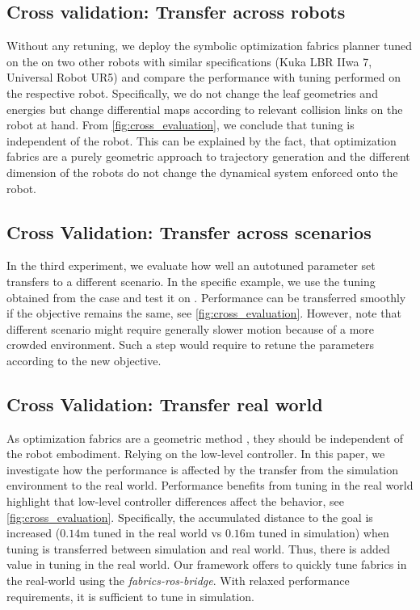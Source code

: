 \subsection{Cross validation: Transfer across robots}
\label{sub:cross_validation_robots}
%
Without any retuning, we deploy the symbolic optimization fabrics planner tuned
on the \panda{} on two other robots with similar specifications (Kuka LBR IIwa
7, Universal Robot UR5) and compare the performance with tuning performed on
the respective robot. 
Specifically, we do not change the leaf geometries and energies but change
differential maps according to relevant collision links on the robot at hand.
From \cref{fig:cross_evaluation}, we conclude that tuning is independent of the
robot. This can be explained by the fact, that optimization fabrics are a
purely geometric approach to trajectory generation and the different
dimension of the robots do not change the dynamical system enforced onto the
robot.
%
\subsection{Cross Validation: Transfer across scenarios}
\label{sub:cros_validation_tasks}
%
In the third experiment, we evaluate how well an autotuned parameter set
transfers to a different scenario. In the specific example, we use the tuning
obtained from the \reachinginring{} case and test it on \reachingontable{}.
Performance can be transferred smoothly if the objective remains the same, see
\cref{fig:cross_evaluation}. However, note that different scenario might
require generally slower motion because of a more crowded environment. Such a
step would require to retune the parameters according to the new objective.
%
\subsection{Cross Validation: Transfer real world}
\label{sub:cross_validation_transfer_real_world}
%
%
As optimization fabrics are a geometric method \cite{Wyk2022}, they should be
independent of the robot embodiment. Relying on the low-level controller. In
this paper, we investigate how the performance is affected by the transfer from
the simulation environment to the real world. 
Performance benefits from tuning in the real world highlight that low-level
controller differences affect the behavior, see \cref{fig:cross_evaluation}.
Specifically, the accumulated distance to the goal is increased ($0.14$m tuned
in the real world vs $0.16$m tuned in simulation) when tuning is transferred
between simulation and real world. Thus, there is added value in tuning in the
real world. Our framework offers to quickly tune fabrics in the real-world
using the \textit{fabrics-ros-bridge}. With relaxed performance requirements, it
is sufficient to tune in simulation.%

